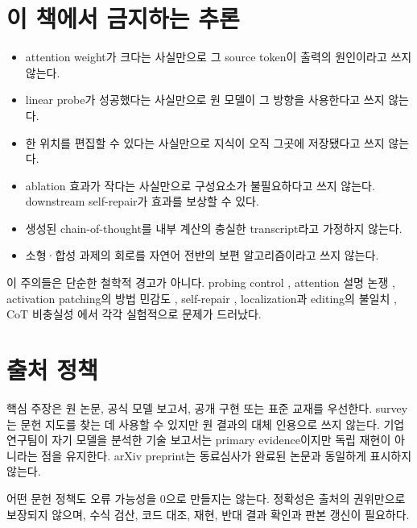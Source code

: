 \section*{이 책에서 금지하는 추론}

\begin{itemize}
  \item attention weight가 크다는 사실만으로 그 source token이 출력의 원인이라고 쓰지 않는다.
  \item linear probe가 성공했다는 사실만으로 원 모델이 그 방향을 사용한다고 쓰지 않는다.
  \item 한 위치를 편집할 수 있다는 사실만으로 지식이 오직 그곳에 저장됐다고 쓰지 않는다.
  \item ablation 효과가 작다는 사실만으로 구성요소가 불필요하다고 쓰지 않는다.
    downstream self-repair가 효과를 보상할 수 있다.
  \item 생성된 chain-of-thought를 내부 계산의 충실한 transcript라고 가정하지 않는다.
  \item 소형·합성 과제의 회로를 자연어 전반의 보편 알고리즘이라고 쓰지 않는다.
\end{itemize}

이 주의들은 단순한 철학적 경고가 아니다.
probing control \citep{hewitt2019probes}, attention 설명 논쟁 \citep{jain2019attention,wiegreffe2019attention}, activation patching의 방법 민감도 \citep{zhang2024activation}, self-repair \citep{mcgrath2023hydra}, localization과 editing의 불일치 \citep{hase2023localization}, CoT 비충실성 \citep{turpin2023unfaithful}에서 각각 실험적으로 문제가 드러났다.

\section*{출처 정책}

핵심 주장은 원 논문, 공식 모델 보고서, 공개 구현 또는 표준 교재를 우선한다.
survey는 문헌 지도를 찾는 데 사용할 수 있지만 원 결과의 대체 인용으로 쓰지 않는다.
기업 연구팀이 자기 모델을 분석한 기술 보고서는 primary evidence이지만 독립 재현이 아니라는 점을 유지한다.
arXiv preprint는 동료심사가 완료된 논문과 동일하게 표시하지 않는다.

\begin{limitbox}
어떤 문헌 정책도 오류 가능성을 0으로 만들지는 않는다.
정확성은 출처의 권위만으로 보장되지 않으며, 수식 검산, 코드 대조, 재현, 반대 결과 확인과 판본 갱신이 필요하다.
\end{limitbox}
